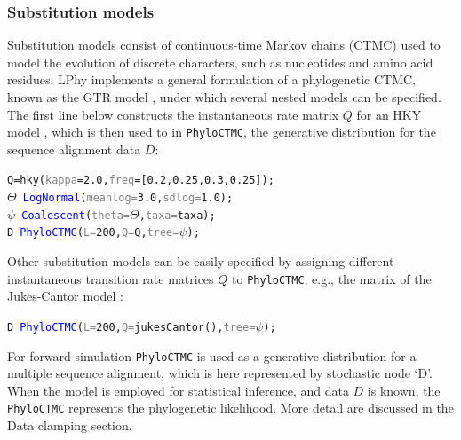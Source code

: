 \documentclass[10pt,letterpaper,table]{article}
\theoremstyle{definition}
\begin{document}
\subsubsection{Substitution models}
Substitution models consist of continuous-time Markov chains (CTMC) used to model the evolution of discrete characters, such as nucleotides and amino acid residues. 
LPhy implements a general formulation of a phylogenetic CTMC, known as the GTR model \cite{gtr}, under which several nested models can be specified. 
The first line below constructs the instantaneous rate matrix $Q$ for an HKY model \cite{hasegawa1985dating}, which is then used to in \texttt{PhyloCTMC}, the generative distribution for the sequence alignment data $D$:

{
  \small
  \begin{listing}
    \begin{alltt}
    Q = \textcolor{generator}{hky}(\textcolor{gray}{kappa}=\textcolor{constant}{2.0}, \textcolor{gray}{freq}=[\textcolor{constant}{0.2}, \textcolor{constant}{0.25}, \textcolor{constant}{0.3}, \textcolor{constant}{0.25}]);
    \textcolor{bluishgreen}{\(\Theta\)} ~ \textcolor{blue}{LogNormal}(\textcolor{gray}{meanlog=}\textcolor{constant}{3.0}, \textcolor{gray}{sdlog=}\textcolor{constant}{1.0});
    \textcolor{bluishgreen}{\(\psi\)} ~ \textcolor{blue}{Coalescent}(\textcolor{gray}{theta=}\textcolor{bluishgreen}{\(\Theta\)}, \textcolor{gray}{taxa=}taxa);
    \textcolor{bluishgreen}{D} ~ \textcolor{blue}{PhyloCTMC}(\textcolor{gray}{L=}\textcolor{constant}{200}, \textcolor{gray}{Q=}Q, \textcolor{gray}{tree=}\textcolor{bluishgreen}{\(\psi\)});
    \end{alltt}
  \end{listing}
}

Other substitution models can be easily specified by assigning different instantaneous transition rate matrices $Q$ to \texttt{PhyloCTMC}, e.g., the matrix of the Jukes-Cantor model \cite{jc69}:
{
  \small
  \begin{listing}
    \begin{alltt}
    \textcolor{bluishgreen}{D} ~ \textcolor{blue}{PhyloCTMC}(\textcolor{gray}{L=}\textcolor{constant}{200}, \textcolor{gray}{Q=}\textcolor{generator}{jukesCantor}(), \textcolor{gray}{tree=}\textcolor{bluishgreen}{\(\psi\)});
    \end{alltt}
  \end{listing}
}

For forward simulation \texttt{PhyloCTMC} is used as a generative distribution for a multiple sequence alignment, which is here represented by stochastic node `D'. When the model is employed for statistical inference, and data $D$ is known, the \texttt{PhyloCTMC} represents the phylogenetic likelihood. 
More detail are discussed in the Data clamping section.
\end{document}
